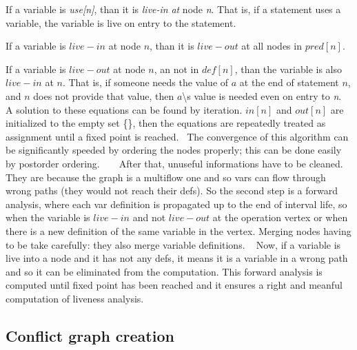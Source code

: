 \begin{DoxyItemize}
\item If a variable is {\itshape use\mbox{[}n\mbox{]}}, than it is {\itshape live-\/in} {\itshape at} node {\itshape n}. That is, if a statement uses a variable, the variable is live on entry to the statement.
\item If a variable is $ live-in $ at node $ n $, than it is $ live-out $ at all nodes in $ pred[n] $.
\item If a variable is $ live-out $ at node $ n $, an not in $ def[n] $, than the variable is also $ live-in $ at $ n $. That is, if someone needs the value of $ a $ at the end of statement $ n $, and $ n $ does not provide that value, then $ a $\textbackslash{}\textquotesingle{}s value is needed even on entry to {\itshape n}.~\newline
 A solution to these equations can be found by iteration. $ in[n] $ and $ out[n] $ are initialized to the empty set \{\}, then the equations are repeatedly treated as assignment until a fixed point is reached.~\newline
 The convergence of this algorithm can be significantly speeded by ordering the nodes properly; this can be done easily by postorder ordering. ~\newline
~\newline
 After that, unuseful informations have to be cleaned. They are because the graph is a multiflow one and so vars can flow through wrong paths (they would not reach their defs). So the second step is a forward analysis, where each var definition is propagated up to the end of interval life, so when the variable is $ live-in$ and not $ live-out$ at the operation vertex or when there is a new definition of the same variable in the vertex. Merging nodes having to be take carefully\+: they also merge variable definitions. ~\newline
 Now, if a variable is live into a node and it has not any defs, it means it is a variable in a wrong path and so it can be eliminated from the computation. This forward analysis is computed until fixed point has been reached and it ensures a right and meanful computation of liveness analysis.
\end{DoxyItemize}\hypertarget{src_HLS_registerAllocation_page_cgcreation}{}\subsection{Conflict graph creation}\label{src_HLS_registerAllocation_page_cgcreation}
